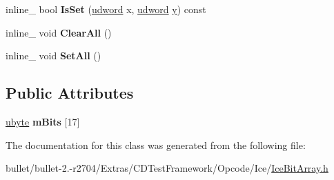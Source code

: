 \begin{DoxyCompactItemize}
\item 
\hypertarget{class_bool_square_symmetric_matrix16_a8b4343c203982767f4559ec1c573a7e1}{inline\+\_\+ bool {\bfseries Is\+Set} (\hyperlink{_ice_types_8h_a44c6f1920ba5551225fb534f9d1a1733}{udword} x, \hyperlink{_ice_types_8h_a44c6f1920ba5551225fb534f9d1a1733}{udword} \hyperlink{_ice_utils_8h_aa7ffaed69623192258fb8679569ff9ba}{y}) const }\label{class_bool_square_symmetric_matrix16_a8b4343c203982767f4559ec1c573a7e1}

\item 
\hypertarget{class_bool_square_symmetric_matrix16_a60640cccb675e651161480d10fded6fc}{inline\+\_\+ void {\bfseries Clear\+All} ()}\label{class_bool_square_symmetric_matrix16_a60640cccb675e651161480d10fded6fc}

\item 
\hypertarget{class_bool_square_symmetric_matrix16_a875e4d2b6b2280e7b5025c6c844f44c8}{inline\+\_\+ void {\bfseries Set\+All} ()}\label{class_bool_square_symmetric_matrix16_a875e4d2b6b2280e7b5025c6c844f44c8}

\end{DoxyCompactItemize}
\subsection*{Public Attributes}
\begin{DoxyCompactItemize}
\item 
\hypertarget{class_bool_square_symmetric_matrix16_a4a0c5b92a7759e9d44de2c3cf3020a6a}{\hyperlink{_ice_types_8h_a5dd4f281954ce1405c92d62a427f839a}{ubyte} {\bfseries m\+Bits} \mbox{[}17\mbox{]}}\label{class_bool_square_symmetric_matrix16_a4a0c5b92a7759e9d44de2c3cf3020a6a}

\end{DoxyCompactItemize}


The documentation for this class was generated from the following file\+:\begin{DoxyCompactItemize}
\item 
bullet/bullet-\/2.-\/r2704/\+Extras/\+C\+D\+Test\+Framework/\+Opcode/\+Ice/\hyperlink{_ice_bit_array_8h}{Ice\+Bit\+Array.\+h}\end{DoxyCompactItemize}
